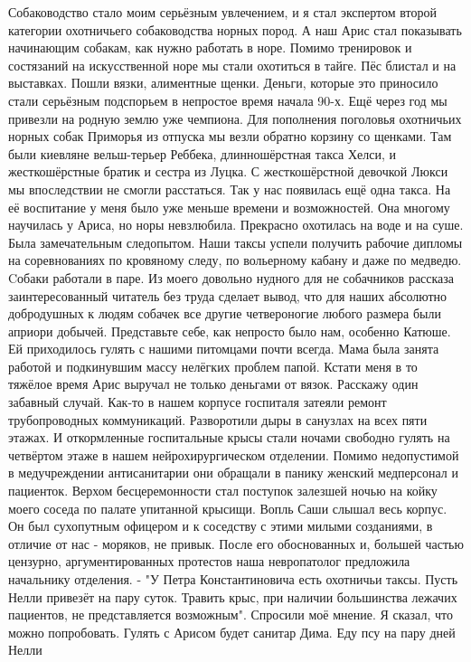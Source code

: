 Собаководство стало моим серьёзным увлечением, и
я стал экспертом второй категории охотничьего собаководства норных пород. А наш
Арис стал показывать начинающим собакам, как нужно работать в норе. Помимо
тренировок и состязаний на искусственной норе мы стали охотиться в тайге. Пёс
блистал и на выставках. Пошли вязки, алиментные щенки. Деньги, которые это
приносило стали серьёзным подспорьем в непростое время начала 90-х. Ещё через
год мы привезли на родную землю уже чемпиона. Для пополнения поголовья
охотничьих норных собак Приморья из отпуска мы везли обратно корзину со
щенками. Там были киевляне вельш-терьер Реббека, длинношёрстная такса Хелси, и
жесткошёрстные братик и сестра из Луцка. С жесткошёрстной девочкой Люкси мы
впоследствии не смогли расстаться. Так у нас появилась ещё одна такса. На её
воспитание у меня было уже меньше времени и возможностей. Она многому научилась
у Ариса, но норы невзлюбила. Прекрасно охотилась на воде и на суше. Была
замечательным следопытом. Наши таксы успели получить рабочие дипломы на
соревнованиях по кровяному следу,  по вольерному кабану и даже по медведю.
Cобаки работали в паре. Из моего довольно нудного для не собачников рассказа
заинтересованный читатель без труда сделает вывод, что для наших абсолютно
добродушных к людям собачек все другие четвероногие любого размера были априори
добычей. Представьте себе, как непросто было нам, особенно Катюше. Ей
приходилось гулять с нашими питомцами почти всегда. Мама была занята работой и
подкинувшим массу нелёгких проблем папой. Кстати меня в то тяжёлое время Арис
выручал не только деньгами от вязок. Расскажу один забавный случай. Как-то в
нашем корпусе госпиталя затеяли ремонт трубопроводных коммуникаций. Разворотили
дыры в санузлах на всех пяти этажах. И откормленные госпитальные крысы стали
ночами свободно гулять на четвёртом этаже в нашем нейрохирургическом отделении.
Помимо недопустимой в медучреждении антисанитарии они обращали в панику женский
медперсонал и пациенток. Верхом бесцеремонности стал поступок залезшей ночью на
койку моего соседа по палате упитанной крысищи. Вопль Саши слышал весь корпус.
Он был сухопутным офицером и к соседству с этими милыми созданиями, в отличие
от нас - моряков, не привык. После его обоснованных и, большей частью цензурно,
аргументированных протестов наша невропатолог предложила начальнику отделения.
- "У Петра Константиновича есть охотничьи таксы. Пусть Нелли привезёт на пару
суток. Травить крыс, при наличии большинства лежачих пациентов, не
представляется возможным". Спросили моё мнение. Я сказал, что можно
попробовать. Гулять с Арисом будет санитар Дима. Еду псу на пару дней Нелли
